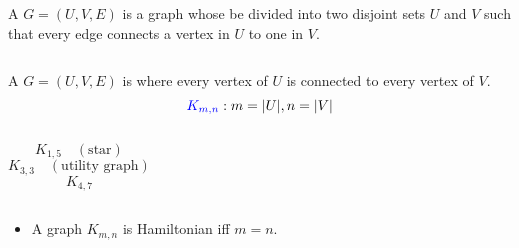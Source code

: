 \begin{frame}{}
  \begin{definition}
    A  $G = (U, V, E)$ is a graph
    whose   be divided into
    two disjoint sets $U$ and $V$ such that
    every edge connects a vertex in $U$ to one in $V$.
  \end{definition}

  \begin{columns}
      \pause
  \end{columns}
\end{frame}

\begin{frame}{}
  \begin{definition}
    A  $G = (U, V, E)$ is 
    where every vertex of $U$ is connected to every vertex of $V$.
    \[
      \textcolor{blue}{K_{m, n}}: m = |U|, n = |V|
    \]
  \end{definition}

  \pause
  \begin{columns}
      \[
        K_{1, 5} \quad (\text{star})
      \]
      \[
        K_{3, 3} \quad (\text{utility graph})
      \]
      \[
        K_{4, 7}
      \]
  \end{columns}
\end{frame}

\begin{frame}{}
  \begin{exampleblock}{}
    \begin{itemize}
      \item A  graph $K_{m, n}$ is Hamiltonian
        iff $m = n$.
    \end{itemize}
  \end{exampleblock}

  \pause
  \vspace{0.60cm}
  \begin{columns}
  \end{columns}
\end{frame}

